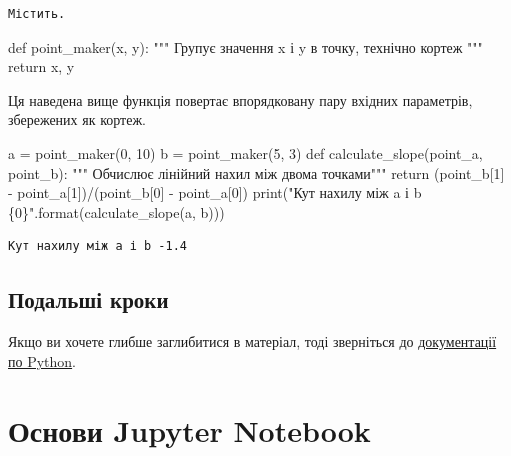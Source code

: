 \documentclass[
  letterpaper,
]{report}
\newenvironment{Shaded}{\begin{snugshade}}{\end{snugshade}}
\newcommand{\BuiltInTok}[1]{\textcolor[rgb]{0.00,0.23,0.31}{#1}}
\newcommand{\CommentTok}[1]{\textcolor[rgb]{0.37,0.37,0.37}{#1}}
\newcommand{\ControlFlowTok}[1]{\textcolor[rgb]{0.00,0.23,0.31}{#1}}
\newcommand{\DecValTok}[1]{\textcolor[rgb]{0.68,0.00,0.00}{#1}}
\newcommand{\KeywordTok}[1]{\textcolor[rgb]{0.00,0.23,0.31}{#1}}
\newcommand{\NormalTok}[1]{\textcolor[rgb]{0.00,0.23,0.31}{#1}}
\newcommand{\OperatorTok}[1]{\textcolor[rgb]{0.37,0.37,0.37}{#1}}
\newcommand{\SpecialCharTok}[1]{\textcolor[rgb]{0.37,0.37,0.37}{#1}}
\newcommand{\StringTok}[1]{\textcolor[rgb]{0.13,0.47,0.30}{#1}}
\begin{document}
\begin{verbatim}
Містить.
\end{verbatim}

\begin{Shaded}
\begin{Highlighting}[]
\KeywordTok{def}\NormalTok{ point\_maker(x, y):}
    \CommentTok{""" Групує значення x і y в точку, технічно кортеж """}
    \ControlFlowTok{return}\NormalTok{ x, y}
\end{Highlighting}
\end{Shaded}

Ця наведена вище функція повертає впорядковану пару вхідних параметрів,
збережених як кортеж.

\begin{Shaded}
\begin{Highlighting}[]
\NormalTok{a }\OperatorTok{=}\NormalTok{ point\_maker(}\DecValTok{0}\NormalTok{, }\DecValTok{10}\NormalTok{)}
\NormalTok{b }\OperatorTok{=}\NormalTok{ point\_maker(}\DecValTok{5}\NormalTok{, }\DecValTok{3}\NormalTok{)}
\KeywordTok{def}\NormalTok{ calculate\_slope(point\_a, point\_b):}
    \CommentTok{""" Обчислює лінійний нахил між двома точками"""}
    \ControlFlowTok{return}\NormalTok{ (point\_b[}\DecValTok{1}\NormalTok{] }\OperatorTok{{-}}\NormalTok{ point\_a[}\DecValTok{1}\NormalTok{])}\OperatorTok{/}\NormalTok{(point\_b[}\DecValTok{0}\NormalTok{] }\OperatorTok{{-}}\NormalTok{ point\_a[}\DecValTok{0}\NormalTok{])}
\BuiltInTok{print}\NormalTok{(}\StringTok{"Кут нахилу між a і b }\SpecialCharTok{\{0\}}\StringTok{"}\NormalTok{.}\BuiltInTok{format}\NormalTok{(calculate\_slope(a, b)))}
\end{Highlighting}
\end{Shaded}

\begin{verbatim}
Кут нахилу між a і b -1.4
\end{verbatim}

\hypertarget{ux43fux43eux434ux430ux43bux44cux448ux456-ux43aux440ux43eux43aux438}{%
\section{Подальші
кроки}\label{ux43fux43eux434ux430ux43bux44cux448ux456-ux43aux440ux43eux43aux438}}

Якщо ви хочете глибше заглибитися в матеріал, тоді зверніться до
\href{https://docs.python.org/3/index.html}{документації по Python}.

\hypertarget{ux43eux441ux43dux43eux432ux438-jupyter-notebook}{%
\chapter{Основи Jupyter
Notebook}\label{ux43eux441ux43dux43eux432ux438-jupyter-notebook}}
\end{document}
